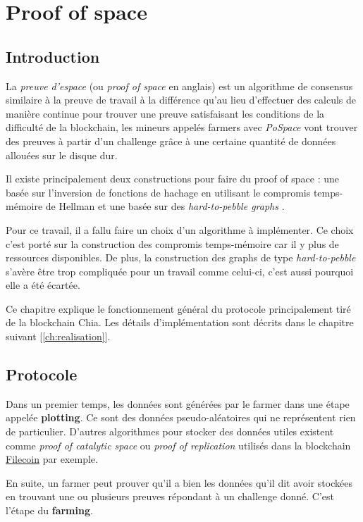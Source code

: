 \chapter{Proof of space}
\label{ch:pospace}

\section{Introduction}

La \emph{preuve d'espace} (ou \emph{proof of space} en anglais) est un algorithme de consensus similaire à la preuve de travail à la différence qu'au lieu d'effectuer des calculs de manière continue pour trouver une preuve satisfaisant les conditions de la difficulté de la blockchain, les mineurs appelés farmers avec \emph{PoSpace} vont trouver des preuves à partir d'un challenge grâce à une certaine quantité de données allouées sur le disque dur. 

Il existe principalement deux constructions pour faire du proof of space : une basée sur l'inversion de fonctions de hachage en utilisant le compromis temps-mémoire de Hellman \cite{DBLP:conf/asiacrypt/AbusalahACKPR17} et une basée sur des \emph{hard-to-pebble graphs} \cite{DBLP:conf/crypto/DziembowskiFKP15}.

Pour ce travail, il a fallu faire un choix d'un algorithme à implémenter. Ce choix c'est porté sur la construction des compromis temps-mémoire car il y plus de ressources disponibles. De plus, la construction des graphs de type \emph{hard-to-pebble} s'avère être trop compliquée pour un travail comme celui-ci, c'est aussi pourquoi elle a été écartée.

Ce chapitre explique le fonctionnement général du protocole principalement tiré de la blockchain Chia. Les détails d'implémentation sont décrits dans le chapitre suivant [\ref{ch:realisation}].

\section{Protocole}

Dans un premier temps, les données sont générées par le farmer dans une étape appelée \textbf{plotting}. Ce sont des données pseudo-aléatoires qui ne représentent rien de particulier. D'autres algorithmes pour stocker des données utiles existent comme \emph{proof of catalytic space} ou \emph{proof of replication} utilisés dans la blockchain \href{https://filecoin.io/}{Filecoin} par exemple.

En suite, un farmer peut prouver qu'il a bien les données qu'il dit avoir stockées en trouvant une ou plusieurs preuves répondant à un challenge donné. C'est l'étape du \textbf{farming}.

